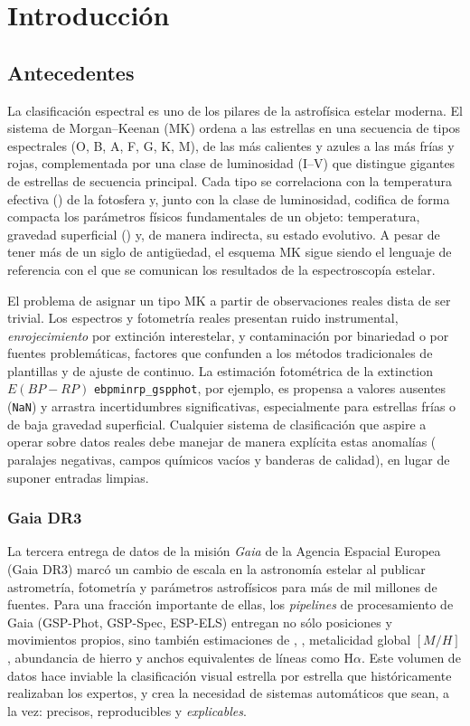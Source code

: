 \section{Introducción}
\label{sec:introduccion}

\subsection{Antecedentes}
\label{sec:antecedentes}

La clasificación espectral es uno de los pilares de la astrofísica estelar
moderna. El sistema de Morgan--Keenan (MK) \citep{morgan1943} ordena a las estrellas en una
secuencia de tipos espectrales (O, B, A, F, G, K, M), de las más calientes y
azules a las más frías y rojas, complementada por una clase de luminosidad
(I--V) que distingue gigantes de estrellas de secuencia principal. Cada tipo se
correlaciona con la temperatura efectiva (\teff) de la fotosfera y, junto con la
clase de luminosidad, codifica de forma compacta los parámetros físicos
fundamentales de un objeto: temperatura, gravedad superficial (\logg) y, de
manera indirecta, su estado evolutivo. A pesar de tener más de un siglo de
antigüedad, el esquema MK sigue siendo el lenguaje de referencia con el que se
comunican los resultados de la espectroscopía estelar.

El problema de asignar un tipo MK a partir de observaciones reales dista de
ser trivial. Los espectros y fotometría reales presentan ruido instrumental,
\emph{enrojecimiento} por extinción interestelar, y contaminación por
binariedad o por fuentes problemáticas, factores que confunden a los métodos
tradicionales de plantillas y de ajuste de continuo. La estimación fotométrica
de la extinction $E(BP-RP)$ \verb|ebpminrp_gspphot|, por ejemplo, es
propensa a valores ausentes (\texttt{NaN}) y arrastra incertidumbres
significativas, especialmente para estrellas frías o de baja gravedad
superficial. Cualquier sistema de clasificación que aspire a operar sobre datos
reales debe manejar de manera explícita estas anomalías (
paralajes negativas, campos químicos vacíos y banderas de calidad), en lugar
de suponer entradas limpias.

\subsubsection{Gaia DR3}

La tercera entrega de datos de la misión \emph{Gaia} de la Agencia Espacial
Europea (Gaia DR3) marcó un cambio de escala en la astronomía estelar al
publicar astrometría, fotometría y parámetros astrofísicos para más de mil
millones de fuentes. Para una fracción importante de ellas, los \emph{pipelines}
de procesamiento de Gaia (GSP-Phot, GSP-Spec, ESP-ELS) entregan no sólo
posiciones y movimientos propios, sino también estimaciones de \teff, \logg,
metalicidad global $[M/H]$, abundancia de hierro y anchos equivalentes de
líneas como H$\alpha$. Este volumen de datos hace inviable la clasificación
visual estrella por estrella que históricamente realizaban los expertos, y crea
la necesidad de sistemas automáticos que sean, a la vez: precisos,
reproducibles y \emph{explicables}.

